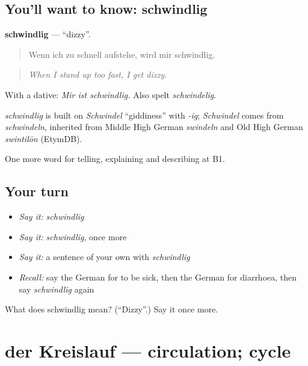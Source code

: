 \subsection*{You'll want to know: schwindlig}
\textbf{schwindlig} — \textquotedblleft{}dizzy\textquotedblright{}.

\begin{quote}
Wenn ich zu schnell aufstehe, wird mir schwindlig.
\end{quote}

\begin{quote}
\emph{When I stand up too fast, I get dizzy.}
\end{quote}

With a dative: \emph{Mir ist schwindlig.} Also spelt \emph{schwindelig}.

\begin{cousinweb}
\emph{schwindlig} is built on \emph{Schwindel} \textquotedblleft{}giddiness\textquotedblright{} with \emph{-ig}; \emph{Schwindel} comes from \emph{schwindeln}, inherited from Middle High German \emph{swindeln} and Old High German \emph{swintilōn} (EtymDB).
\end{cousinweb}

\begin{grammarlens}[title={What you've built}]
One more word for telling, explaining and describing at B1.
\end{grammarlens}

\subsection*{Your turn}
\begin{itemize}
\raggedright
  \item \emph{Say it:} \emph{schwindlig}
  \item \emph{Say it:} \emph{schwindlig}, once more
  \item \emph{Say it:} a sentence of your own with \emph{schwindlig}
  \item \emph{Recall:} say the German for to be sick, then the German for diarrhoea, then say \emph{schwindlig} again
\end{itemize}

\begin{tcolorbox}[breakable,colback=teal!4,colframe=teal!35!black,title={Before you move on}]
What does schwindlig mean? (\textquotedblleft{}Dizzy\textquotedblright{}.) Say it once more.
\end{tcolorbox}
\section[der Kreislauf]{der Kreislauf — circulation; cycle}

